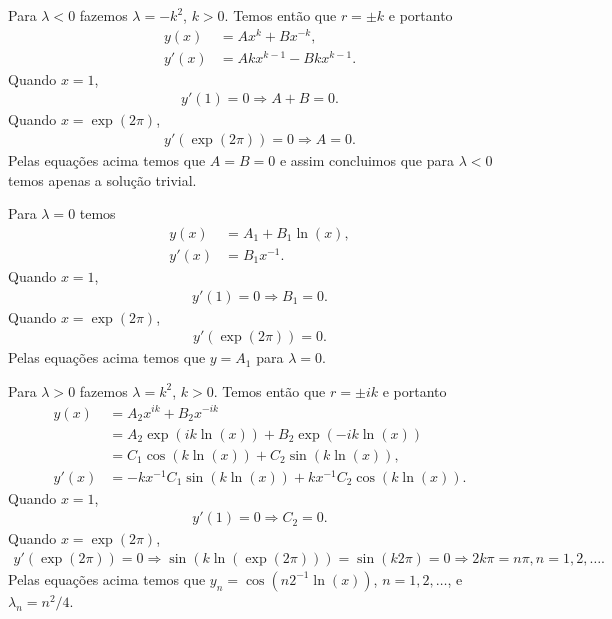 \documentclass[a4paper,12pt, leqno, answers]{exam}
\begin{document}
\begin{questions}
\begin{solution}
        Para $\lambda < 0$ fazemos $\lambda = - k^2$, $k > 0$. Temos ent\~{a}o que $r = \pm k$ e portanto
        \begin{align*}
            y(x) &= A x^k + B x^{-k}, \\
            y'(x) &= A k x^{k - 1} - B k x^{k - 1}.
        \end{align*}
        Quando $x = 1$,
        \begin{align*}
            y'(1) = 0 \Rightarrow A + B = 0.
        \end{align*}
        Quando $x = \exp(2\pi)$,
        \begin{align*}
            y'(\exp(2\pi)) = 0 \Rightarrow A = 0.
        \end{align*}
        Pelas equa\c{c}\~{o}es acima temos que $A = B = 0$ e assim concluimos que para $\lambda < 0$ temos apenas a solu\c{c}\~{a}o trivial.

        Para $\lambda = 0$ temos
        \begin{align*}
            y(x) &= A_1 + B_1 \ln(x), \\
            y'(x) & = B_1 x^{-1}.
        \end{align*}
        Quando $x = 1$,
        \begin{align*}
            y'(1) = 0 \Rightarrow B_1 = 0.
        \end{align*}
        Quando $x = \exp(2\pi)$,
        \begin{align*}
            y'(\exp(2\pi)) = 0.
        \end{align*}
        Pelas equa\c{c}\~{o}es acima temos que $y = A_1$ para $\lambda = 0$.

        Para $\lambda > 0$ fazemos $\lambda = k^2$, $k > 0$. Temos ent\~{a}o que $r = \pm i k$ e portanto
        \begin{align*}
            y(x) &= A_2 x^{i k} + B_2 x^{-i k} \\
            &= A_2 \exp(i k \ln(x)) + B_2 \exp(-i k \ln(x)) \\
            &= C_1 \cos(k \ln(x)) + C_2 \sin(k \ln(x)), \\
            y'(x) &= -k x^{-1} C_1 \sin(k \ln(x)) + k x^{-1} C_2 \cos(k \ln(x)).
        \end{align*}
        Quando $x = 1$,
        \begin{align*}
            y'(1) = 0 \Rightarrow C_2 = 0.
        \end{align*}
        Quando $x = \exp(2\pi)$,
        \begin{align*}
            y'(\exp(2\pi)) = 0 \Rightarrow \sin(k \ln(\exp(2\pi))) = \sin(k 2 \pi) = 0 \Rightarrow 2 k \pi = n \pi, n = 1, 2, \ldots.
        \end{align*}
        Pelas equa\c{c}\~{o}es acima temos que $y_n = \cos(n 2^{-1} \ln(x))$, $n = 1, 2, \ldots$, e $\lambda_n = n^2 / 4$.


\end{solution}
\end{questions}
\end{document}
